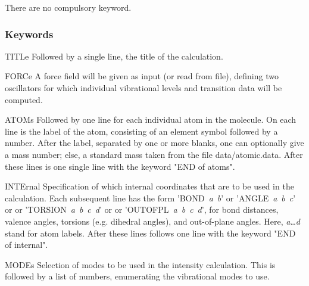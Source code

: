 There are no compulsory keyword.

\subsubsection{Keywords}

\begin{keywordlist}
\item[TITLe]
Followed by a single line, the title of the calculation.
\item[FORCe]
A force field will be given as input (or read from file), defining two
oscillators for which individual vibrational levels and transition
data will be computed.
\item[ATOMs]
Followed by one line for each individual atom in the molecule.
On each line is the label of the atom, consisting of an element symbol
followed by a number. After the label, separated by one or more blanks,
one can optionally give a mass number; else, a standard mass taken from
the file data/atomic.data.
After these lines is one single line with the keyword "END of atoms".
\item[INTErnal]
Specification of which internal coordinates that are to be used in the
calculation. Each subsequent line has the form '\mbox{BOND {\em a} {\em b}}'
or '\mbox{ANGLE {\em a} {\em b} {\em c}}' or
or '\mbox{TORSION {\em a} {\em b} {\em c} {\em d}}' or
or '\mbox{OUTOFPL {\em a} {\em b} {\em c} {\em d}}', for bond distances,
valence angles, torsions (e.g. dihedral angles), and out-of-plane angles.
Here, {\em a}\dots{\em d} stand for atom labels.
After these lines follows one line with the keyword "END of internal".
\item[MODEs]
Selection of modes to be used in the intensity calculation. This is
followed by a list of numbers, enumerating the vibrational modes to use.

\end{keywordlist}
